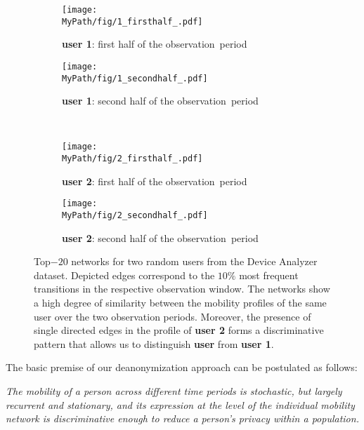 \begin{figure}[!h]
	\centering
	\begin{subfigure}[]{0.49\textwidth}
		\centering		\texttt{[image: \\MyPath/fig/1\_firsthalf\_.pdf]}
		\caption{{\textbf{user 1}: first half of the \mbox{observation period}}}
		\label{fig:evidence11}
	\end{subfigure}%
	\begin{subfigure}[]{0.49\textwidth}
		\centering
		\texttt{[image: \\MyPath/fig/1\_secondhalf\_.pdf]}
		\caption{{\textbf{user 1}: second half of the \mbox{observation period}}}
		\label{fig:evidence12}
	\end{subfigure}%
	\\
	\begin{subfigure}[]{0.49\textwidth}
		\centering
		\texttt{[image: \\MyPath/fig/2\_firsthalf\_.pdf]}
		\caption{{\textbf{user 2}: first half of the \mbox{observation period}}}
		\label{fig:evidence21}
	\end{subfigure}
	\begin{subfigure}[]{0.49\textwidth}
		\centering
		\texttt{[image: \\MyPath/fig/2\_secondhalf\_.pdf]}
		\caption{{\textbf{user 2}: second half of the \mbox{observation period}}}
		\label{fig:evidence22}
	\end{subfigure}
	\caption{{Top$-20$ networks for two random users from the Device Analyzer dataset.
  Depicted edges correspond to the $10\%$ most frequent transitions in the respective observation window.
  The networks show a high degree of similarity between the mobility profiles of the same user over the two observation periods.
  Moreover, the presence of single directed edges in the profile of \textbf{user 2} forms a discriminative pattern that allows us to distinguish \textbf{user} from \textbf{user 1}.}}
	\label{fig:evidence}
\end{figure}


The basic premise of our deanonymization approach can be postulated as follows:

\begin{tcolorbox}
\emph{
	The mobility of a person across different time periods is stochastic, but largely recurrent and stationary, and its expression at the level of the individual mobility network is discriminative enough to reduce a person's privacy within a population.}
\end{tcolorbox}

